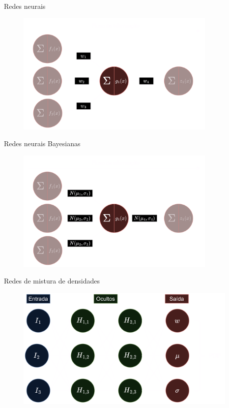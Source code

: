 \begin{frame}[c]{Redes neurais}
    \begin{figure}
        \centering
        \includegraphics[height=6cm]{script/images/neuron_ml_pesos.png}
    \end{figure}
\end{frame}


\begin{frame}[c]{Redes neurais Bayesianas}
    \begin{figure}
        \centering
        \includegraphics[height=6cm]{script/images/neuron_ml_bayes.png}
    \end{figure}
\end{frame}

\begin{frame}[c]{Redes de mistura de densidades}
    \begin{figure}
        \centering
        \includegraphics[height=6cm]{script/images/rede_mdn.png}
    \end{figure}
\end{frame}

